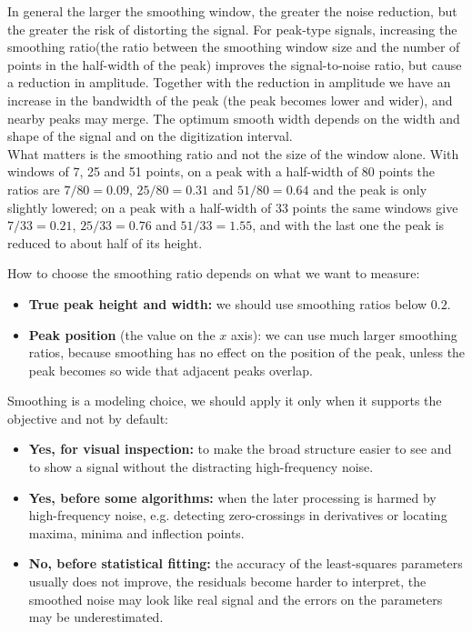 In general the larger the smoothing window, the greater the noise reduction, but the greater the risk of distorting the signal. For peak-type signals, increasing the smoothing ratio(the ratio between the smoothing window size and the number of points in the half-width of the peak) improves the signal-to-noise ratio, but cause a reduction in amplitude.
Together with the reduction in amplitude we have an increase in the bandwidth of the peak (the peak becomes lower and wider), and nearby peaks may merge. The optimum smooth width depends on the width and shape of the signal and on the digitization interval.
\\

What matters is the smoothing ratio and not the size of the window alone. With windows of 7, 25 and 51 points, on a peak with a half-width of 80 points the ratios are $7/80=0.09$, $25/80=0.31$ and $51/80=0.64$ and the peak is only slightly lowered; on a peak with a half-width of 33 points the same windows give $7/33=0.21$, $25/33=0.76$ and $51/33=1.55$, and with the last one the peak is reduced to about half of its height.

How to choose the smoothing ratio depends on what we want to measure:
\begin{itemize}
    \item \textbf{True peak height and width:} we should use smoothing ratios below $0.2$.
    \item \textbf{Peak position} (the value on the $x$ axis): we can use much larger smoothing ratios, because smoothing has no effect on the position of the peak, unless the peak becomes so wide that adjacent peaks overlap.
\end{itemize}

Smoothing is a modeling choice, we should apply it only when it supports the objective and not by default:
\begin{itemize}
    \item \textbf{Yes, for visual inspection:} to make the broad structure easier to see and to show a signal without the distracting high-frequency noise.
    \item \textbf{Yes, before some algorithms:} when the later processing is harmed by high-frequency noise, e.g. detecting zero-crossings in derivatives or locating maxima, minima and inflection points.
    \item \textbf{No, before statistical fitting:} the accuracy of the least-squares parameters usually does not improve, the residuals become harder to interpret, the smoothed noise may look like real signal and the errors on the parameters may be underestimated.
\end{itemize}

